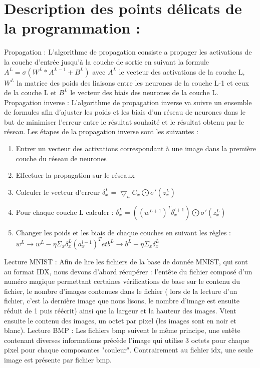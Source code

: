 \documentclass{article}
\begin{document}
\section{Description des points délicats de la programmation :}
Propagation :
L'algorithme de propagation consiste a propager les activations de la couche d'entrée jusqu'à la couche de sortie en suivant la formule $A^L = \sigma( W^L * A^{L-1} + B^L )$ avec $A^L$ le vecteur des activations de la couche L, $W^L$ la matrice des poids des liaisons entre les neurones de la couche L-1 et ceux de la couche L et $B^L$ le vecteur des biais des neurones de la couche L.
Propagation inverse :
L'algorithme de propagation inverse va suivre un ensemble de formules afin d'ajuster les poids et les biais d'un réseau de neurones dans le but de minimiser l'erreur entre le résultat souhaité et le résultat obtenu par le réseau. Les étapes de la propagation inverse sont les suivantes :
		\begin{enumerate}
			\item Entrer un vecteur des activations correspondant à une image dans la première couche du réseau de neurones
			\item Effectuer la propagation sur le réseaux
			\item Calculer le vecteur d'erreur $\delta_x^L=\bigtriangledown_aC_x\bigodot\sigma\prime(z_x^L)$
			\item Pour chaque couche L calculer : $\delta_x^L=((w^{L+1})^T\delta_x^{l+1})\bigodot\sigma\prime(z_x^L)$
			\item Changer les poids et les biais de chaque couches en suivant les règles : $w^L \rightarrow w^L-\eta\Sigma_x\delta_x^L(a_x^{l-1})^T et b^L \rightarrow b^L-\eta\Sigma_x\delta_x^L$
		\end{enumerate}
Lecture MNIST :
Afin de lire les fichiers de la base de donnée MNIST, qui sont au format IDX, nous devons d'abord récupérer : l'entête du fichier composé d'un numéro magique permettant certaines vérifications de base sur le contenu du fichier, le nombre d'images contenues dans le fichier ( lors de la lecture d'un fichier, c'est la dernière image que nous lisons, le nombre d'image est ensuite réduit de 1 puis réécrit) ainsi que la largeur et la hauteur des images. Vient ensuite le contenu des images, un octet par pixel (les images sont en noir et blanc).
Lecture BMP :
Les fichiers bmp suivent le même principe, une entête contenant diverses informations précède l'image qui utilise 3 octets pour chaque pixel pour chaque composantes "couleur". Contrairement au fichier idx, une seule image est présente par fichier bmp.
\end{document}
